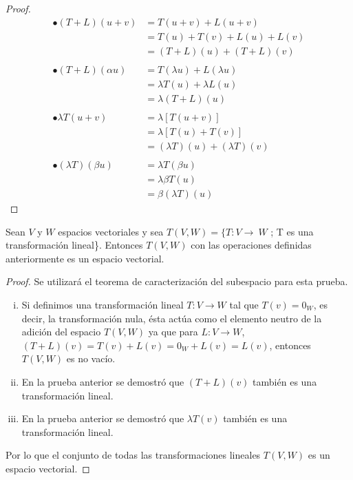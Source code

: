 \begin{proof}
\begin{align*}
\bullet (T+L)(u+v) &=T(u+v) + L(u+v)\\
&= T(u) + T(v) + L(u) + L(v)\\
&= (T+L)(u) + (T+L)(v)\\
\\
\bullet(T+L)(\alpha u) &= T(\lambda u) + L(\lambda u)\\
&= \lambda T(u)+ \lambda L(u)\\
&= \lambda (T+L)(u) \\
\\
\bullet \lambda T(u+v) &= \lambda [T(u+v)]\\
&= \lambda [T(u) + T(v)]\\
&= (\lambda T)(u) + (\lambda T)(v)\\
\\
\bullet (\lambda T)(\beta u) &= \lambda T(\beta u)\\
&=\lambda \beta T(u)\\
&= \beta (\lambda T)(u)
\end{align*}
\end{proof}

\begin{theorem}
Sean $V$ y $W$ espacios vectoriales y sea $T(V, W) = \{T : V \to~W$ ; T es una transformación lineal\}. Entonces $T(V, W)$ con las operaciones definidas anteriormente es un espacio vectorial.
\end{theorem}

\begin{proof}
Se utilizará el teorema de caracterización del subespacio para esta prueba.
\begin{enumerate}[i.]
    \item Si definimos una transformación lineal $T: V \to W$ tal que $T(v) = 0_W$, es decir, la transformación nula, ésta actúa como el elemento neutro de la adición del espacio $T(V,W)$ ya que para $L: V \to W$, $(T + L)(v) = T(v) + L(v) = 0_W + L(v) = L(v)$, entonces $T(V,W)$ es no vacío.
    \item En la prueba anterior se demostró que $(T+L)(v)$ también es una transformación lineal.
    \item En la prueba anterior se demostró que $\lambda T(v)$ también es una transformación lineal.
\end{enumerate}
Por lo que el conjunto de todas las transformaciones lineales $T(V,W)$ es un espacio vectorial.
\end{proof}

